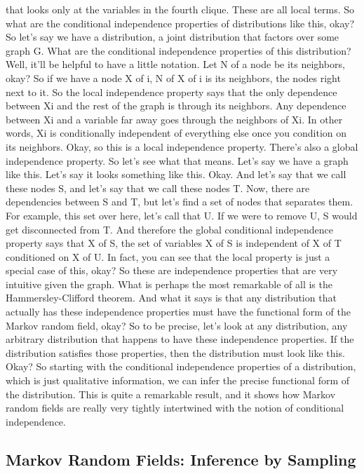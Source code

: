 \documentclass{article}
\begin{document}
\begin{flushleft}
that looks only at the variables in the fourth clique. These are all local terms. So what are the conditional independence properties of distributions like this, okay? So let's say we have a distribution, a joint distribution that factors over some graph G. What are the conditional independence properties of this distribution? Well, it'll be helpful to have a little notation. Let N of a node be its neighbors, okay? So if we have a node X of i, N of X of i is its neighbors, the nodes right next to it. So the local independence property says that the only dependence between Xi and the rest of the graph is through its neighbors. Any dependence between Xi and a variable far away goes through the neighbors of Xi. In other words, Xi is conditionally independent of everything else once you condition on its neighbors. Okay, so this is a local independence property. There's also a global independence property. So let's see what that means. Let's say we have a graph like this. Let's say it looks something like this. Okay. And let's say that we call these nodes S, and let's say that we call these nodes T. Now, there are dependencies between S and T, but let's find a set of nodes that separates them. For example, this set over here, let's call that U. If we were to remove U, S would get disconnected from T. And therefore the global conditional independence property says that X of S, the set of variables X of S is independent of X of T conditioned on X of U. In fact, you can see that the local property is just a special case of this, okay? So these are independence properties that are very intuitive given the graph. What is perhaps the most remarkable of all is the Hammersley-Clifford theorem. And what it says is that any distribution that actually has these independence properties must have the functional form of the Markov random field, okay? So to be precise, let's look at any distribution, any arbitrary distribution that happens to have these independence properties. If the distribution satisfies those properties, then the distribution must look like this. Okay? So starting with the conditional independence properties of a distribution, which is just qualitative information, we can infer the precise functional form of the distribution. This is quite a remarkable result, and it shows how Markov random fields are really very tightly intertwined with the notion of conditional independence.
\end{flushleft}
\newpage

\subsection{Markov Random Fields: Inference by Sampling}
\end{document}
